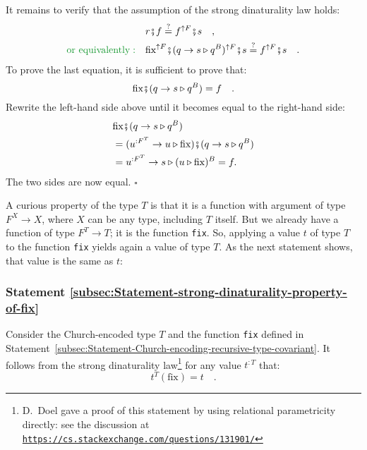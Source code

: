 It remains to verify that the assumption of the strong dinaturality
law holds:
\begin{align*}
 & r\bef f\overset{?}{=}f^{\uparrow F}\bef s\quad,\\
{\color{greenunder}\text{or equivalently}:}\quad & \text{fix}^{\uparrow F}\bef(q\rightarrow s\triangleright q^{B})^{\uparrow F}\bef s\overset{?}{=}f^{\uparrow F}\bef s\quad.
\end{align*}
To prove the last equation, it is sufficient to prove that:
\[
\text{fix}\bef(q\rightarrow s\triangleright q^{B})=f\quad.
\]
Rewrite the left-hand side above until it becomes equal to the right-hand
side:
\begin{align*}
 & \text{fix}\bef(q\rightarrow s\triangleright q^{B})\\
 & =(u^{:F^{T}}\rightarrow u\triangleright\text{fix})\bef(q\rightarrow s\triangleright q^{B})\\
 & =u^{:F^{T}}\rightarrow s\triangleright(u\triangleright\text{fix})^{B}=f.
\end{align*}
The two sides are now equal. $\square$

A curious property of the type $T$ is that it is a function with
argument of type $F^{X}\rightarrow X$, where $X$ can be any type,
including $T$ itself. But we already have a function of type $F^{T}\rightarrow T$;
it is the function \lstinline!fix!. So, applying a value $t$ of
type $T$ to the function \lstinline!fix! yields again a value of
type $T$. As the next statement shows, that value is the same as
$t$:

\subsubsection{Statement \label{subsec:Statement-strong-dinaturality-property-of-fix}\ref{subsec:Statement-strong-dinaturality-property-of-fix}}

Consider the Church-encoded type $T$ and the function \lstinline!fix!
defined in Statement~\ref{subsec:Statement-Church-encoding-recursive-type-covariant}.
It follows from the strong dinaturality law\footnote{D.~Doel gave a proof of this statement by using
relational parametricity directly: see the discussion at \texttt{\href{https://cs.stackexchange.com/questions/131901/}{https://cs.stackexchange.com/questions/131901/}}} for any value $t^{:T}$ that:
\begin{equation}
t^{T}(\text{fix})=t\quad.\label{eq:fix-unfix-property-of-T}
\end{equation}


